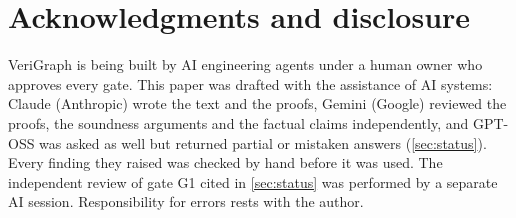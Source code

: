\documentclass[11pt,a4paper]{article}
\theoremstyle{plain}
\theoremstyle{definition}
\theoremstyle{remark}
\newcommand{\VG}{VeriGraph}
\begin{document}











\section*{Acknowledgments and disclosure}
\VG{} is being built by AI engineering agents under a human owner who approves every gate.
This paper was drafted with the assistance of AI systems: Claude (Anthropic) wrote the text
and the proofs, Gemini (Google) reviewed the proofs, the soundness arguments and the factual
claims independently, and GPT-OSS was asked as well but returned partial or mistaken answers
(\cref{sec:status}). Every finding they raised was checked by hand before it was used.
The independent review of gate G1 cited in \cref{sec:status} was performed by a separate AI
session. Responsibility for errors rests with the author.




\appendix

\end{document}

